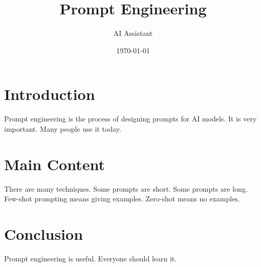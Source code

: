 \documentclass[12pt]{article}
\title{Prompt Engineering}
\author{AI Assistant}
\date{\today}
\begin{document}
\maketitle

\section{Introduction}
Prompt engineering is the process of designing prompts for AI models.
It is very important. Many people use it today.

\section{Main Content}
There are many techniques. Some prompts are short. Some prompts are long.
Few-shot prompting means giving examples. Zero-shot means no examples.

\section{Conclusion}
Prompt engineering is useful. Everyone should learn it.
\end{document}
